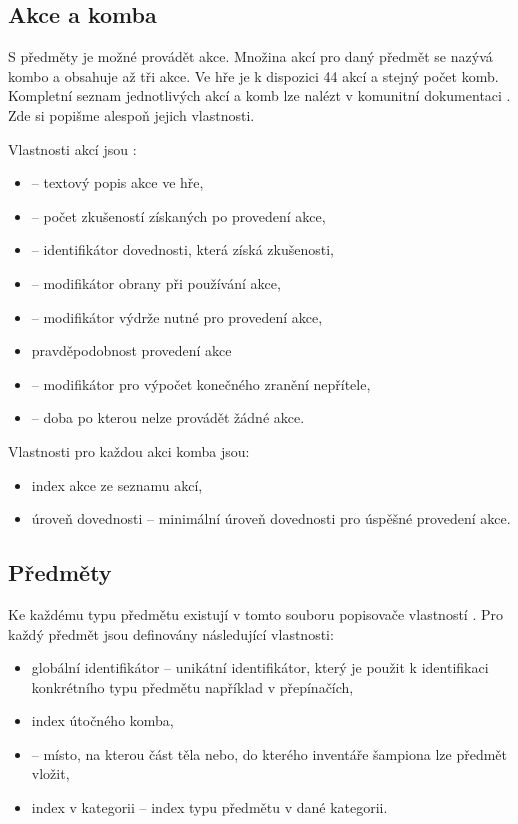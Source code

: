 \subsection{Akce a komba}\label{action-combos}

S předměty je možné provádět akce. Množina akcí pro daný předmět se nazývá kombo a obsahuje 
až tři akce. Ve hře je k dispozici 44 akcí a stejný počet komb. Kompletní seznam jednotlivých
akcí a komb lze nalézt v komunitní dokumentaci \cite{DMActions}. Zde si popišme alespoň jejich vlastnosti.

Vlastnosti akcí jsou :
\begin{itemize}
\item {} -- textový popis akce ve hře,
\item {} -- počet zkušeností získaných po provedení akce,
\item {} -- identifikátor dovednosti, která získá zkušenosti,
\item {} -- modifikátor obrany při používání akce,
\item {} -- modifikátor výdrže nutné pro provedení akce, 
\item pravděpodobnost provedení akce 
\item {} -- modifikátor pro výpočet konečného zranění nepřítele, 
\item {} -- doba po kterou nelze provádět žádné akce. 
\end{itemize}

Vlastnosti pro každou akci komba jsou:
\begin{itemize}
\item index akce ze seznamu akcí, 
\item úroveň dovednosti -- minimální úroveň dovednosti pro úspěšné provedení akce. 
\end{itemize}


\subsection{Předměty}\label{item-descriptors}

Ke každému typu předmětu existují v tomto souboru popisovače vlastností \cite{DMItemDescriptors}.
Pro každý předmět jsou definovány následující vlastnosti:  
\begin{itemize}
\item globální identifikátor -- unikátní identifikátor, který je použit k identifikaci konkrétního typu předmětu například v přepínačích,
\item index útočného komba,
\item {} -- místo, na kterou část těla nebo, do kterého inventáře šampiona lze předmět vložit,
\item index v kategorii -- index typu předmětu v dané kategorii.
\end{itemize}

